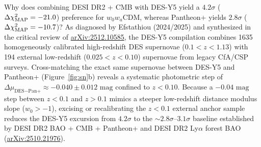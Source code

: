 \documentclass[aps,prd,preprint,superscriptaddress,nofootinbib]{revtex4-2}
\begin{document}
Why does combining DESI DR2 + CMB with DES-Y5 yield a $4.2\sigma$ ($\Delta\chi^2_{\rm MAP} = -21.0$) preference for $w_0 w_a$CDM, whereas Pantheon+ yields $2.8\sigma$ ($\Delta\chi^2_{\rm MAP} = -10.7$)? As diagnosed by Efstathiou (2024/2025) and synthesized in the critical review of \href{https://arxiv.org/abs/2512.10585}{arXiv:2512.10585}, the DES-Y5 compilation combines 1635 homogeneously calibrated high-redshift DES supernovae ($0.1 < z < 1.13$) with 194 external low-redshift ($0.025 < z < 0.10$) supernovae from legacy CfA/CSP surveys. Cross-matching the exact same supernovae between DES-Y5 and Pantheon+ (Figure~\ref{fig:sn}b) reveals a systematic photometric step of $\Delta\mu_{\text{DES}-\text{Pan+}} \approx -0.040 \pm 0.012\text{ mag}$ confined to $z < 0.10$. Because a $-0.04\text{ mag}$ step between $z < 0.1$ and $z > 0.1$ mimics a steeper low-redshift distance modulus slope ($w_0 > -1$), excising or recalibrating the $z < 0.1$ external anchor sample reduces the DES-Y5 excursion from $4.2\sigma$ to the $\sim 2.8\sigma\text{--}3.1\sigma$ baseline established by DESI DR2 BAO + CMB + Pantheon+ and DESI DR2 Ly$\alpha$ forest BAO (\href{https://arxiv.org/abs/2510.21976}{arXiv:2510.21976}).

\end{document}
